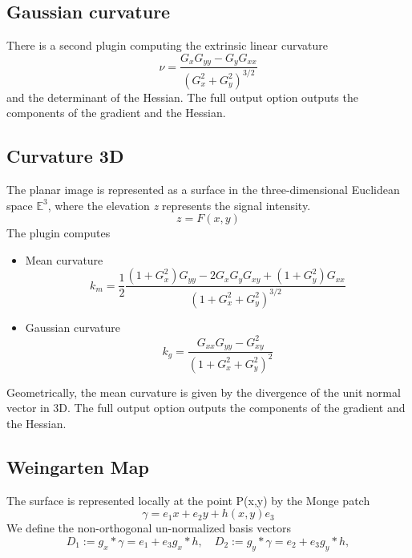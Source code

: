 \documentclass{amsart}
\begin{document}
\subsection{Gaussian curvature}
There is a second plugin computing the extrinsic linear curvature 
\[
\nu = \frac{G_{x} G_{yy}- G_{y} G_{xx}}{\left( G_{x}^2 + G_{y}^2\right)^{3/2} }
\]
and the determinant of the Hessian.
The full output option outputs the components of the gradient and the Hessian.




\subsection{Curvature 3D}\label{sec:curvature}

The planar image is represented as a surface in the three-dimensional Euclidean space $ \mathbb{E}^3$, where the elevation \textit{z} represents the signal intensity.
\[
z = F(x,y)
\]
The plugin computes 
\begin{itemize}
	\item Mean curvature   
	\[
k_m =	\frac{1 }{2}\frac{\left( 1+G_{x}^2\right)  G_{yy} - 2 G_{x} G_{y} G_{xy} +\left(1 +G_{y}^2 \right) G_{xx}  }  {\left( 1 + G_{x}^2 +G_{y}^2\right)^{3/2}} 
	\]
 
	\item Gaussian curvature 
	\[  
k_g=	\frac {G_{xx} G_{yy} - G_{xy}^2}  {\left( 1 + G_{x}^2 +G_{y}^2\right)^2 }
	\]
\end{itemize}
Geometrically, the mean curvature is given by the divergence of the unit normal vector in 3D. 
The full output option outputs the components of the gradient and the Hessian.

\subsection{Weingarten Map}\label{sec:weing}
The surface is represented locally at the point P(x,y) by the Monge patch
\[
\gamma = e_1 x +e_2 y + h (x,y) e_3
\]
We define the non-orthogonal un-normalized basis vectors
\[
D_1:= g_x \ast \gamma =e_1 + e_3 g_x \ast h , \quad D_2:= g_y \ast \gamma = e_2 + e_3  g_y \ast h, 
\]
\end{document}
